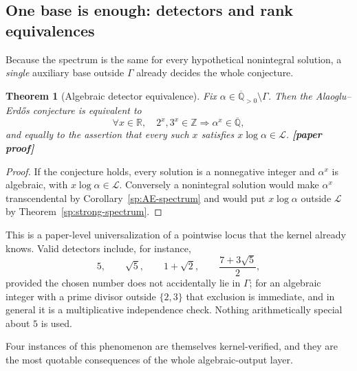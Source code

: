 \documentclass[11pt,oneside]{article}
\newtheorem{theorem}{Theorem}[section]
\theoremstyle{definition}
\theoremstyle{remark}
\newcommand{\Z}{\mathbb Z}
\newcommand{\R}{\mathbb R}
\newcommand{\Abar}{\overline{\mathbb Q}}
\newcommand{\Apos}{\Abar_{>0}}
\newcommand{\LL}{\mathcal L}
\newcommand{\GammaSat}{\Gamma}
\newcommand{\Qbar}{\Abar}
\newcommand{\statusnew}{\textcolor{newgreen}{\textbf{[paper proof]}}}
\begin{document}
\subsection{One base is enough: detectors and rank equivalences}

Because the spectrum is the same for every hypothetical nonintegral solution, a
\emph{single} auxiliary base outside $\GammaSat$ already decides the whole conjecture.

\begin{theorem}[Algebraic detector equivalence]\label{sp:detector}
Fix $\alpha\in\Apos\setminus\GammaSat$.  Then the Alaoglu--Erd\H{o}s conjecture is equivalent
to
\[
  \forall x\in\R,\quad 2^{x},3^{x}\in\Z\Longrightarrow \alpha^{x}\in\Qbar,
\]
and equally to the assertion that every such $x$ satisfies $x\log\alpha\in\LL$.  \statusnew
\end{theorem}

\begin{proof}
If the conjecture holds, every solution is a nonnegative integer and $\alpha^{x}$ is
algebraic, with $x\log\alpha\in\LL$.  Conversely a nonintegral solution would make
$\alpha^{x}$ transcendental by Corollary~\ref{sp:AE-spectrum} and would put $x\log\alpha$
outside $\LL$ by Theorem~\ref{sp:strong-spectrum}.
\end{proof}

This is a paper-level universalization of a pointwise locus that the kernel already knows.
Valid detectors include, for instance,
\[
  5,\qquad \sqrt5,\qquad 1+\sqrt2,\qquad \frac{7+3\sqrt5}{2},
\]
provided the chosen number does not accidentally lie in $\GammaSat$; for an algebraic integer
with a prime divisor outside $\{2,3\}$ that exclusion is immediate, and in general it is a
multiplicative independence check.  Nothing arithmetically special about $5$ is used.

Four instances of this phenomenon are themselves kernel-verified, and they are the most
quotable consequences of the whole algebraic-output layer.
\end{document}

